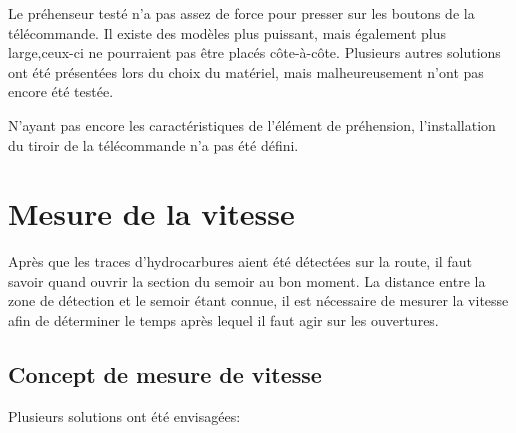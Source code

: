 Le préhenseur testé n'a pas assez de force pour presser sur les boutons de la télécommande. Il existe des modèles plus puissant, mais également
plus large,ceux-ci ne pourraient pas être placés côte-à-côte. Plusieurs autres solutions ont été présentées lors du choix du matériel, mais malheureusement
n'ont pas encore été testée.

N'ayant pas encore les caractéristiques de l'élément de préhension, l'installation du tiroir de la télécommande n'a pas été défini.

\section{Mesure de la vitesse}
Après que les traces d'hydrocarbures aient été détectées sur la route, il faut savoir quand ouvrir la section du semoir au bon moment. La distance entre la zone de détection et le semoir étant connue,
il est nécessaire de mesurer la vitesse afin de déterminer le temps après lequel il faut agir sur les ouvertures.
\subsection{Concept de mesure de vitesse}
Plusieurs solutions ont été envisagées:

